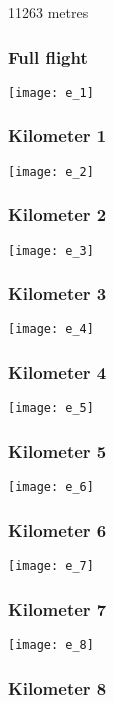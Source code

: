 \documentclass[]{article}
\begin{document}
11263 metres

\subsubsection{Full flight}\label{full-flight-4}

\texttt{[image: e\_1]}

\subsubsection{Kilometer 1}\label{kilometer-1-4}

\texttt{[image: e\_2]}

\subsubsection{Kilometer 2}\label{kilometer-2-4}

\texttt{[image: e\_3]}

\subsubsection{Kilometer 3}\label{kilometer-3-4}

\texttt{[image: e\_4]}

\subsubsection{Kilometer 4}\label{kilometer-4-4}

\texttt{[image: e\_5]}

\subsubsection{Kilometer 5}\label{kilometer-5-4}

\texttt{[image: e\_6]}

\subsubsection{Kilometer 6}\label{kilometer-6-4}

\texttt{[image: e\_7]}

\subsubsection{Kilometer 7}\label{kilometer-7-4}

\texttt{[image: e\_8]}

\subsubsection{Kilometer 8}\label{kilometer-8-4}
\end{document}
